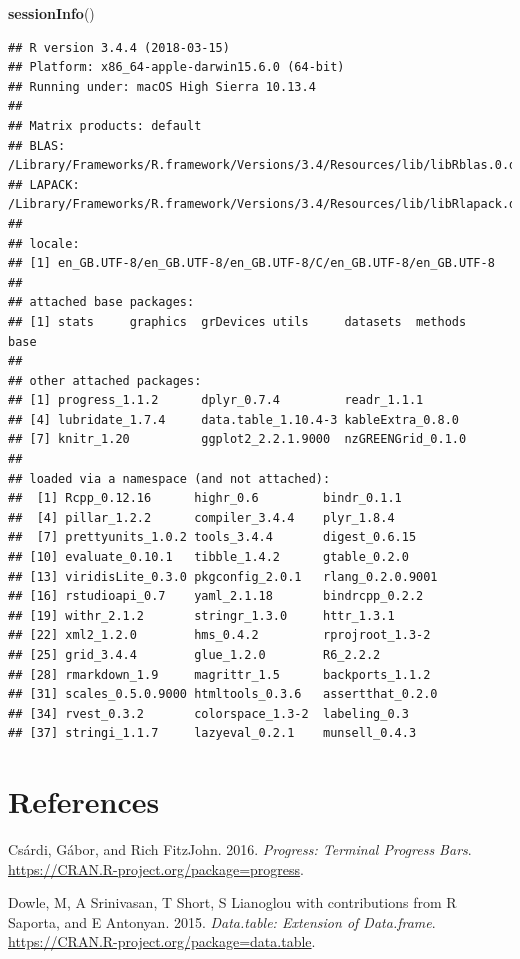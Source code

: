 \documentclass[]{article}
\newenvironment{Shaded}{\begin{snugshade}}{\end{snugshade}}
\newcommand{\KeywordTok}[1]{\textcolor[rgb]{0.13,0.29,0.53}{\textbf{#1}}}
\newcommand{\NormalTok}[1]{#1}
\begin{document}
\begin{Shaded}
\begin{Highlighting}[]
\KeywordTok{sessionInfo}\NormalTok{()}
\end{Highlighting}
\end{Shaded}

\begin{verbatim}
## R version 3.4.4 (2018-03-15)
## Platform: x86_64-apple-darwin15.6.0 (64-bit)
## Running under: macOS High Sierra 10.13.4
## 
## Matrix products: default
## BLAS: /Library/Frameworks/R.framework/Versions/3.4/Resources/lib/libRblas.0.dylib
## LAPACK: /Library/Frameworks/R.framework/Versions/3.4/Resources/lib/libRlapack.dylib
## 
## locale:
## [1] en_GB.UTF-8/en_GB.UTF-8/en_GB.UTF-8/C/en_GB.UTF-8/en_GB.UTF-8
## 
## attached base packages:
## [1] stats     graphics  grDevices utils     datasets  methods   base     
## 
## other attached packages:
## [1] progress_1.1.2      dplyr_0.7.4         readr_1.1.1        
## [4] lubridate_1.7.4     data.table_1.10.4-3 kableExtra_0.8.0   
## [7] knitr_1.20          ggplot2_2.2.1.9000  nzGREENGrid_0.1.0  
## 
## loaded via a namespace (and not attached):
##  [1] Rcpp_0.12.16      highr_0.6         bindr_0.1.1      
##  [4] pillar_1.2.2      compiler_3.4.4    plyr_1.8.4       
##  [7] prettyunits_1.0.2 tools_3.4.4       digest_0.6.15    
## [10] evaluate_0.10.1   tibble_1.4.2      gtable_0.2.0     
## [13] viridisLite_0.3.0 pkgconfig_2.0.1   rlang_0.2.0.9001 
## [16] rstudioapi_0.7    yaml_2.1.18       bindrcpp_0.2.2   
## [19] withr_2.1.2       stringr_1.3.0     httr_1.3.1       
## [22] xml2_1.2.0        hms_0.4.2         rprojroot_1.3-2  
## [25] grid_3.4.4        glue_1.2.0        R6_2.2.2         
## [28] rmarkdown_1.9     magrittr_1.5      backports_1.1.2  
## [31] scales_0.5.0.9000 htmltools_0.3.6   assertthat_0.2.0 
## [34] rvest_0.3.2       colorspace_1.3-2  labeling_0.3     
## [37] stringi_1.1.7     lazyeval_0.2.1    munsell_0.4.3
\end{verbatim}

\section*{References}\label{references}

\hypertarget{refs}{}
\hypertarget{ref-progress}{}
Csárdi, Gábor, and Rich FitzJohn. 2016. \emph{Progress: Terminal
Progress Bars}. \url{https://CRAN.R-project.org/package=progress}.

\hypertarget{ref-data.table}{}
Dowle, M, A Srinivasan, T Short, S Lianoglou with contributions from R
Saporta, and E Antonyan. 2015. \emph{Data.table: Extension of
Data.frame}. \url{https://CRAN.R-project.org/package=data.table}.
\end{document}

